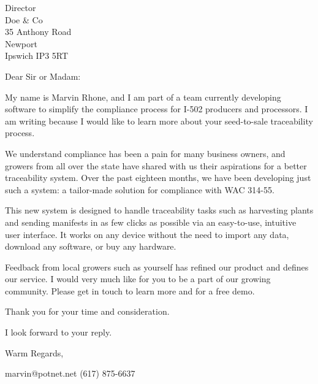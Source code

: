 \documentclass{letter}
\begin{document}
\begin{letter}{Director \\ Doe \& Co \\ 35 Anthony Road
\\ Newport \\ Ipswich IP3 5RT}
\opening{Dear Sir or Madam:}

My name is Marvin Rhone, and I am part of a team currently developing software to simplify the compliance process for I-502 producers and processors. I am writing because I would like to learn more about your seed-to-sale traceability process.

We understand compliance has been a pain for many business owners, and growers from all over the state have shared with us their aspirations for a better traceability system. Over the past eighteen months, we have been developing just such a system: a tailor-made solution for compliance with WAC 314-55. 

This new system is designed to handle traceability tasks such as harvesting plants and sending manifests in as few clicks as possible via an easy-to-use, intuitive user interface. It works on any device without the need to import any data, download any software, or buy any hardware. 

Feedback from local growers such as yourself has refined our product and defines our service. I would very much like for you to be a part of our growing community. Please get in touch to learn more and for a free demo.



Thank you for your time and consideration.

I look forward to your reply.

\closing{Warm Regards,}



marvin@potnet.net
(617) 875-6637



\end{letter}
\end{document}
